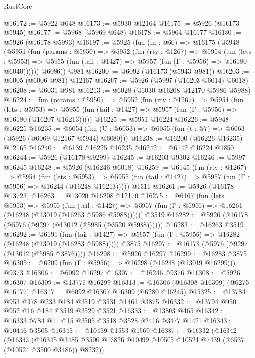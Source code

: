 \begin{lexlean}{RustCore}
\begin{coremodule}
@16172 := @5922 @648
@16173 := @5930 @12164
@16175 := @5926 (@16173 @5945)
@16177 := @5968 (@5969 @648)
@16178 := @5964 @16177
@16180 := @5926 (@16178 @5993)
@16197 := @5925
    (fun (fn : @60) =>
    @16175
      (@5948
        (@5951
          (fun (params : @5950) =>
          @5952
            (fun (rty : @1267) =>
            @5954
              (fun (lets : @5953) =>
              @5955 (fun (tail : @1427) => @5957 (fun (Γ : @5956) => @16180 @6040))))))
        @6086))
    @981
@16200 := @6092 (@16173 (@5943 @981))
@16203 := @6005 (@6006 @981) @12167
@16207 := @5926 (@5997 (@16203 @6014) @6018)
@16208 := @6031 @981
@16213 := @6028 (@6030 @16208 @12170 @5986 @5988)
@16224 := fun (params : @5950) =>
  @5952
    (fun (rty : @1267) =>
    @5954
      (fun (lets : @5953) =>
      @5955 (fun (tail : @1427) => @5957 (fun (Γ : @5956) => @16180 (@16207 @16213)))))
@16225 := @5951 @16224
@16226 := @5948 @16225
@16235 := @6054
    (fun (U : @6053) => @6055 (fun (t : @7) => @6063 (@5926 (@6069 @12167 @5944) @6080)))
@16238 := @16200 (@16226 @16235) @12165
@16240 := @6139 @16225 @16235
@16242 := @6142 @16224 @1850
@16244 := @5926 (@16178 @9299)
@16245 := @16203 @9302
@16246 := @5997 @16245
@16248 := @5926 (@16246 @6018)
@16259 := @6145
    (fun (rty : @1267) =>
    @5954
      (fun (lets : @5953) =>
      @5955 (fun (tail : @1427) => @5957 (fun (Γ : @5956) => @16244 (@16248 @16213)))))
    @1511
@16261 := @5926 (@16178 @13723)
@16263 := @13020 @16208 @12170
@16275 := @6167
    (fun (lets : @5953) =>
    @5955
      (fun (tail : @1427) =>
      @5957 (fun (Γ : @5956) => @16261 (@16248 (@13019 (@16263 @5986 @5988))))))
    @3519
@16282 := @5926 (@16178 (@5976 (@9297 (@13012 (@5985 (@3520 @5988))))))
@16283 := @16263 @3519
@16292 := @6191
    (fun (tail : @1427) => @5957 (fun (Γ : @5956) => @16282 (@16248 (@13019 (@16283 @5988)))))
    @3875
@16297 := @16178 (@5976 (@9297 (@13012 (@5985 @3876))))
@16298 := @5926 @16297
@16299 := @16283 @3875
@16305 := @6209 (fun (Γ : @5956) => @16298 (@16248 (@13019 @16299))) @9373
@16306 := @6092 @16297
@16307 := @16246 @9376
@16308 := @5926 @16307
@16309 := @13773 @16299
@16313 := @16306 (@16308 @16309) (@6275 @16177)
@16317 := @6092 @16307 @16309 (@6280 @16245)
@16325 := @13784 @953 @978 @233 @184 @3519 @3531 @1461 @3875
@16332 := @13794 @950 @952 @16 @184 @3519 @3529 @3521
@16333 := @13803 @465
@16342 := @16333 @784 @11 @15 @3505 @3518 @3528 @2416 @3477 @1421
@16343 := @10446 @3505
@16345 := @10459 @1553 @1569
@16387 := @16332
    (@16342
      (@16343
        (@16345 @3485 @3500 @13826 @10499 @10505 @10521 @7439 (@6537 (@10524 @3500 @3486)) @8232))

\end{coremodule}
\end{lexlean}
